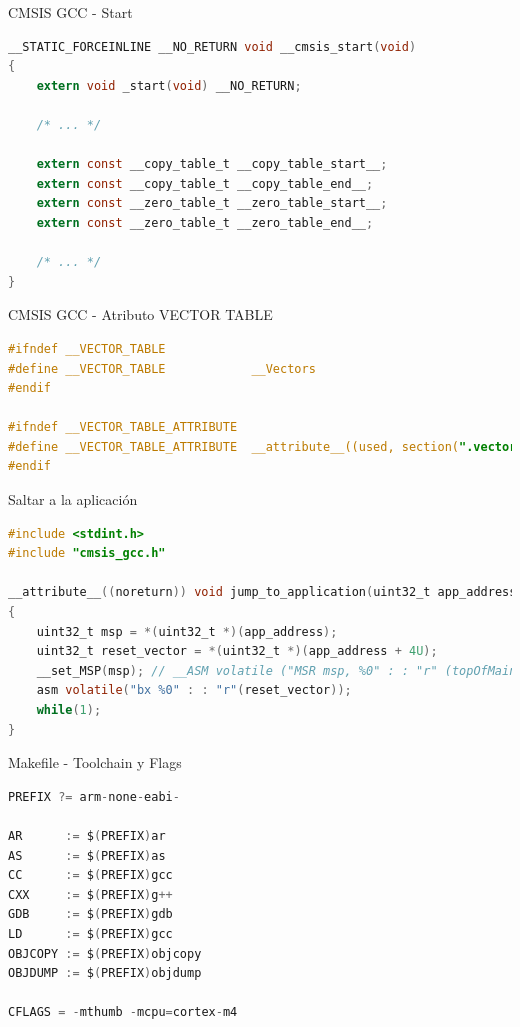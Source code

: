 \documentclass{beamer}
\begin{document}
\begin{frame}[fragile]{CMSIS GCC - Start}
    \begin{lstlisting}[language=C]
__STATIC_FORCEINLINE __NO_RETURN void __cmsis_start(void)
{
    extern void _start(void) __NO_RETURN;

    /* ... */

    extern const __copy_table_t __copy_table_start__;
    extern const __copy_table_t __copy_table_end__;
    extern const __zero_table_t __zero_table_start__;
    extern const __zero_table_t __zero_table_end__;

    /* ... */
}
    \end{lstlisting}
\end{frame}

\begin{frame}[fragile]{CMSIS GCC - Atributo VECTOR TABLE}
    \begin{lstlisting}[language=C]
#ifndef __VECTOR_TABLE
#define __VECTOR_TABLE            __Vectors
#endif

#ifndef __VECTOR_TABLE_ATTRIBUTE
#define __VECTOR_TABLE_ATTRIBUTE  __attribute__((used, section(".vectors")))
#endif
    \end{lstlisting}
\end{frame}

\begin{frame}[fragile]{Saltar a la aplicación}
    \begin{lstlisting}[language=C]
#include <stdint.h>
#include "cmsis_gcc.h"

__attribute__((noreturn)) void jump_to_application(uint32_t app_address)
{
    uint32_t msp = *(uint32_t *)(app_address);
    uint32_t reset_vector = *(uint32_t *)(app_address + 4U);
    __set_MSP(msp); // __ASM volatile ("MSR msp, %0" : : "r" (topOfMainStack) : );
    asm volatile("bx %0" : : "r"(reset_vector));
    while(1);
}
    \end{lstlisting}
\end{frame}

\begin{frame}[fragile]{Makefile - Toolchain y Flags}
    \begin{lstlisting}[language=C]
PREFIX ?= arm-none-eabi-

AR      := $(PREFIX)ar
AS      := $(PREFIX)as
CC      := $(PREFIX)gcc
CXX     := $(PREFIX)g++
GDB     := $(PREFIX)gdb
LD      := $(PREFIX)gcc
OBJCOPY := $(PREFIX)objcopy
OBJDUMP := $(PREFIX)objdump

CFLAGS = -mthumb -mcpu=cortex-m4
    \end{lstlisting}
\end{frame}
\end{document}
